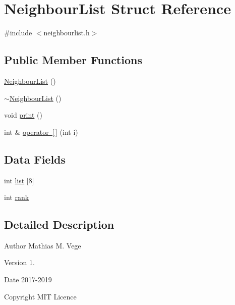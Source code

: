 \hypertarget{struct_neighbour_list}{}\section{Neighbour\+List Struct Reference}
\label{struct_neighbour_list}


{\ttfamily \#include $<$neighbourlist.\+h$>$}

\subsection*{Public Member Functions}
\begin{DoxyCompactItemize}
\item 
\mbox{\hyperlink{struct_neighbour_list_ab376c095d360ea03b0e499a8820bd0e7}{Neighbour\+List}} ()
\item 
\mbox{\hyperlink{struct_neighbour_list_afcdbcc7fde83d4ce3a4fecc8d4105cd8}{$\sim$\+Neighbour\+List}} ()
\item 
void \mbox{\hyperlink{struct_neighbour_list_a9e8123deded59c4c702429fda52af140}{print}} ()
\item 
int \& \mbox{\hyperlink{struct_neighbour_list_a9bd6ad04ef1eb6ad9737ac493b6864d1}{operator \mbox{[}$\,$\mbox{]}}} (int i)
\end{DoxyCompactItemize}
\subsection*{Data Fields}
\begin{DoxyCompactItemize}
\item 
int \mbox{\hyperlink{struct_neighbour_list_ad55e922aabd4ef75711d22c5e5634165}{list}} \mbox{[}8\mbox{]}
\item 
int \mbox{\hyperlink{struct_neighbour_list_abe10231f4cd3e607e19cea0b0d7aab03}{rank}}
\end{DoxyCompactItemize}


\subsection{Detailed Description}
\begin{DoxyAuthor}{Author}
Mathias M. Vege 
\end{DoxyAuthor}
\begin{DoxyVersion}{Version}
1. 
\end{DoxyVersion}
\begin{DoxyDate}{Date}
2017-\/2019 
\end{DoxyDate}
\begin{DoxyCopyright}{Copyright}
M\+IT Licence 
\end{DoxyCopyright}


